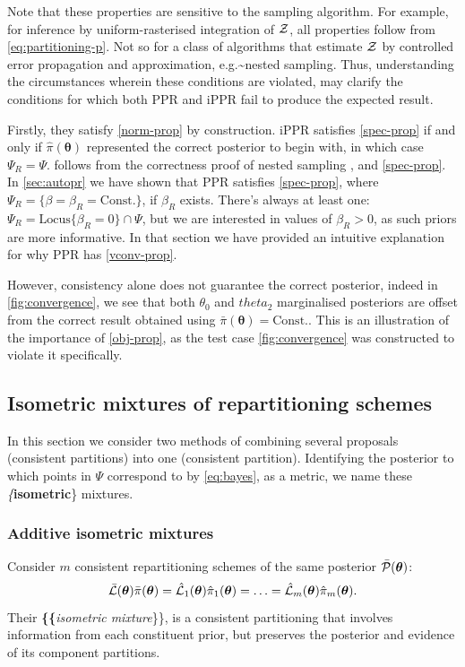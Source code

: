 \documentclass[draft,usenatbib]{mnras}
\begin{document}
Note that these properties are sensitive to the sampling algorithm. For
example, for inference by uniform-rasterised integration of
\({\cal Z}\), all properties follow from \cref{eq:partitioning-p}. Not so
for a class of algorithms that estimate \({\cal Z}\) by controlled error
propagation and approximation, e.g.\textasciitilde{}nested sampling. Thus,
understanding the circumstances wherein these conditions are violated,
may clarify the conditions for which both PPR and iPPR fail to produce
the expected result.

Firstly, they satisfy \cref{norm-prop} by construction. iPPR satisfies
\cref{spec-prop} if and only if \(\hat{\pi} (\bm{\theta})\)
represented the correct posterior to begin with, in which case
\(\Psi_{R} = \Psi\).  follows from the correctness
proof of nested sampling \citep{Skilling2006}, and
\cref{spec-prop}. In \cref{sec:autopr} we have shown that PPR
satisfies \cref{spec-prop}, where
\(\Psi_{R} = \{ \beta = \beta_{R} = \text{Const.}\}\), if \(\beta_{R}\)
exists. There's always at least one:
\(\Psi_{R} = \text{Locus} \{ \beta_{R}=0 \} \cap \Psi\), but we are
interested in values of \(\beta_{R} > 0\), as such priors are more
informative. In that section we have provided an intuitive explanation
for why PPR has \cref{vconv-prop}.

However, consistency alone does not guarantee the correct posterior, indeed in
\cref{fig:convergence}, we see that both \(\theta_{0}\) and \(theta_{2}\)
marginalised posteriors are offset from the correct result obtained
using \(\bar{\pi}(\bm{\theta})=\text{Const.}\). This is an illustration of the
importance of \cref{obj-prop}, as the test case \cref{fig:convergence}
was constructed to violate it specifically.




\subsection{Isometric mixtures of repartitioning schemes}
\label{sec:org7b95d8a}
In this section we consider two methods of combining several
proposals (consistent partitions) into one (consistent
partition). Identifying the posterior to which points in \(\Psi\)
correspond to by \cref{eq:bayes}, as a metric, we name these
\emph\{\textbf{isometric}\} mixtures.



\subsubsection{Additive isometric mixtures}
\label{sec:org3881130}
Consider \(m\) consistent repartitioning schemes of the same
posterior \(\bar{\cal P}(\bm{\theta})\):
\begin{equation}
  \label{eq:collection-of-models}
\bar{\cal L}(\bm{\theta}) \bar{\pi}(\bm{\theta})= \hat{\cal L}_{1}(\bm{\theta}) \hat{\pi}_{1}(\bm{\theta}) =  \ldots =\hat{\cal L}_{m}(\bm{\theta}) \hat{\pi}_{m}(\bm{\theta}).
\end{equation}
Their \textbf\{\textbf\{\emph{isometric mixture}\}\}, is a consistent
partitioning that involves information from each constituent prior,
but preserves the posterior and evidence of its component partitions.
\end{document}
